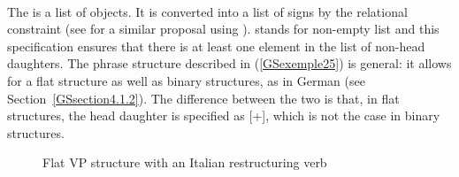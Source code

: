 \vbox{
\ea
\label{GSexemple25}
 \impl \\	
\z
}
\noindent
The \compsl is a list of  objects. It is converted into a list of signs by the
relational constraint  (see \citealt[]{GSag2000a-u} for a similar
proposal using ).  stands for non-empty list and this
specification ensures that there is at least one element in the list of non-head daughters. The
phrase structure described in (\ref{GSexemple25}) is general: it allows for a flat structure as well
as binary structures, as in German (see Section~\ref{GSsection4.1.2}). The difference between the
two is that, in flat structures, the head daughter is specified as \mbox{[\light{}$+$]}, which is
not the case in binary structures.


\begin{figure}
\caption{Flat VP structure with an Italian restructuring verb}
    \label{GSfigure4}
\end{figure}
%

